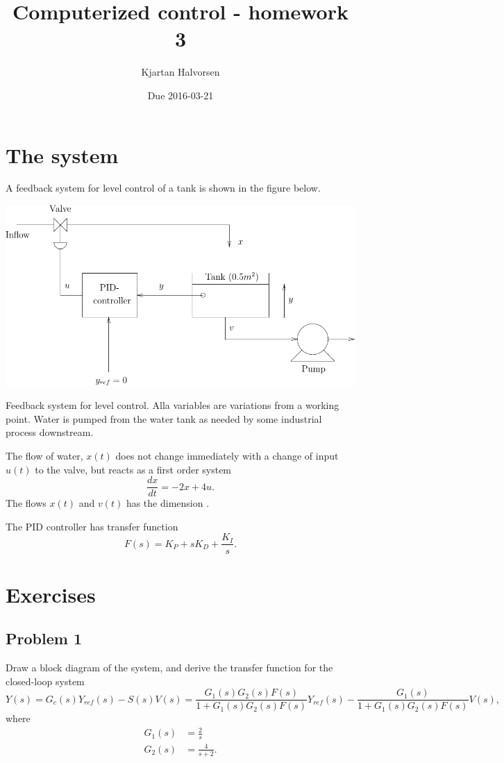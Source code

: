 \documentclass{scrartcl}
\author{Kjartan Halvorsen}
\date{Due 2016-03-21}
\title{Computerized control - homework 3}
\begin{document}
\maketitle

\section*{The system}
\label{sec:orgheadline1}
A feedback system for level control of a tank is shown in the figure below.
\begin{center}
\includegraphics[width=\linewidth]{tank-system-crop}
\caption{Feedback system for level control. Alla variables are variations from a working point. Water is pumped from the water tank as needed by some industrial process downstream.}
\end{center}
The flow of water, \(x(t)\) does not change immediately with a change of input \(u(t)\) to the valve, but reacts as a first order system
\[ \frac{dx}{dt} = -2x + 4u. \]
The flows \(x(t)\) and \(v(t)\) has the dimension \unit{}{\meter\cubed\per\second}.

The PID controller has transfer function 
\[ F(s) = K_P + sK_D + \frac{K_I}{s}. \]

\section*{Exercises}
\label{sec:orgheadline7}
\subsection*{Problem 1}
\label{sec:orgheadline2}
Draw a block diagram of the system, and derive the transfer function for the closed-loop system
\[ Y(s) = G_c(s)Y_{ref}(s) - S(s)V(s) = \frac{G_1(s)G_2(s)F(s)}{1 + G_1(s)G_2(s)F(s)} Y_{ref}(s) - \frac{G_1(s)}{1 + G_1(s)G_2(s)F(s)}V(s), \]
where
\begin{align}
G_1(s) &= \frac{2}{s}\\
G_2(s) &= \frac{4}{s+2}.
\end{align}
\end{document}
